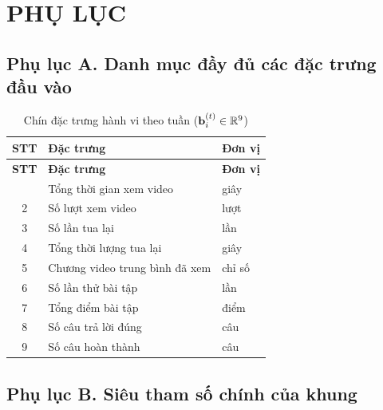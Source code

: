 \appendix
\chapter*{PHỤ LỤC}

\section*{Phụ lục A. Danh mục đầy đủ các đặc trưng đầu vào}

\renewcommand{\arraystretch}{1.25}
\renewcommand{\thetable}{A.1}
\small
\begin{longtable}{@{}c p{6.5cm} p{4.5cm}@{}}
\caption{Chín đặc trưng hành vi theo tuần ($\mathbf{b}_i^{(t)} \in \mathbb{R}^9$)}\\
\toprule
\textbf{STT} & \textbf{Đặc trưng} & \textbf{Đơn vị} \\
\midrule
\endfirsthead
\toprule
\textbf{STT} & \textbf{Đặc trưng} & \textbf{Đơn vị} \\
\midrule
\endhead
\bottomrule
\endfoot
1 & Tổng thời gian xem video & giây \\
2 & Số lượt xem video & lượt \\
3 & Số lần tua lại & lần \\
4 & Tổng thời lượng tua lại & giây \\
5 & Chương video trung bình đã xem & chỉ số \\
6 & Số lần thử bài tập & lần \\
7 & Tổng điểm bài tập & điểm \\
8 & Số câu trả lời đúng & câu \\
9 & Số câu hoàn thành & câu \\
\end{longtable}

\section*{Phụ lục B. Siêu tham số chính của khung}

